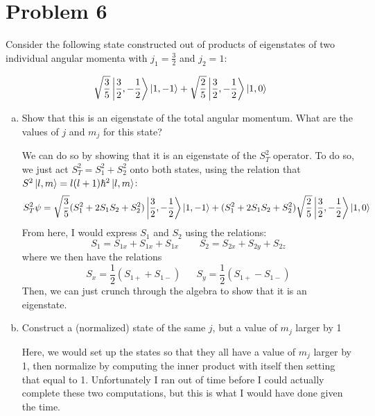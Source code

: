\documentclass[10pt]{article}
\begin{document}
    \pagebreak

    \section*{Problem 6}

    Consider the following state constructed out of products of eigenstates of two individual angular momenta with $j_1 = \frac 32$ and $j_2 = 1$: 

    \[ \sqrt{\frac 35} \ket{\frac 32, -\frac 12} \ket{1, -1} + \sqrt{\frac 25} \ket{\frac 32, -\frac 12}\ket{1, 0}\]

    \begin{enumerate}[(a)]
        \item Show that this is an eigenstate of the total angular momentum. What are the values of $j$ and $m_j$ for this state?
        
        \begin{solution}
            We can do so by showing that it is an eigenstate of the $S_T^2$ operator. To do so, we just act $S_T^2 = S_1^2 + S_2^2$ onto both states, using the relation that $S^2\ket{l, m} = l(l+1)\hbar^2 \ket{l, m}$:
            \[ S_T^2 \psi = \sqrt{\frac 35} (S_1^2 + 2S_1S_2 + S_2^2) \ket{\frac 32, -\frac 12} \ket{1, -1} + (S_1^2 + 2S_1S_2 + S_2^2) \sqrt{\frac 25} \ket{\frac 32, -\frac 12}\ket{1, 0}\]
            From here, I would express $S_1$ and $S_2$ using the relations:
            \[ S_1 = S_{1x} + S_{1x} + S_{1x} \phantom{aaaa} S_2 = S_{2x} + S_{2y} + S_{2z}\] 
            where we then have the relations
            \[ S_x = \frac 12\left( S_{1+} + S_{1-}\right) \phantom{aaa} S_y = \frac 12 \left( S_{1+} - S_{1-}\right)\] 
            Then, we can just crunch through the algebra to show that it is an eigenstate.
        \end{solution}
        \item Construct a (normalized) state of the same $j$, but a value of $m_j$ larger by 1
        
        \begin{solution}
            Here, we would set up the states so that they all have a value of $m_j$ larger by 1, then normalize by computing the inner product with itself then setting that equal to 1. Unfortunately I ran out of time before I could actually complete these two computations, but this is what I would have done given the time.
        \end{solution}
    \end{enumerate}
\end{document}
